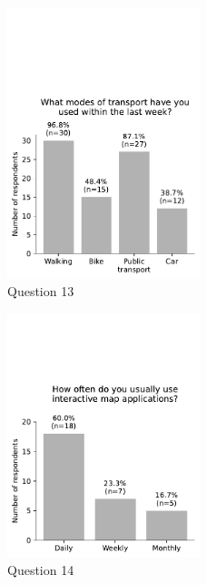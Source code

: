 \begin{figure}[H]
	\centering
	\includegraphics[width=0.5\textwidth]{visual/figures/survey/modes.pdf}
	\caption{Question 13}
	\label{fig:q 13}
\end{figure}

\begin{figure}[H]
	\centering
	\includegraphics[width=0.5\textwidth]{visual/figures/survey/12.pdf}
	\caption{Question 14}
	\label{fig:q 14}
\end{figure}

